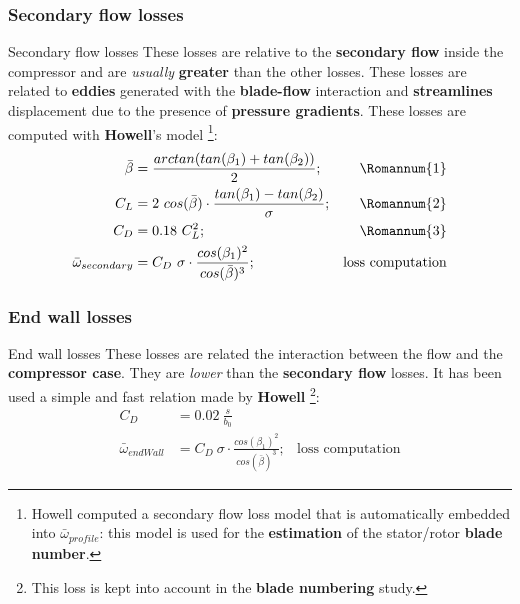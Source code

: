 \subsubsection{Secondary flow losses}
	\begin{frame}{Secondary flow losses}
		These losses are relative to the \textbf{secondary flow} inside the compressor and are \textit{usually} \textbf{greater} than the other losses. These losses are related to \textbf{eddies} generated with the \textbf{blade-flow} interaction and \textbf{streamlines} displacement due to the presence of \textbf{pressure gradients}. 
		\newline 
		These losses are computed with \textbf{Howell}'s model \cite[Ch. 6]{axial2004}\footnote{Howell computed a secondary flow loss model that is automatically embedded into $\bar{\omega}_{profile}$: this model is used for the \textbf{estimation} of the stator/rotor \textbf{blade number}.}:
		\begin{align}
			\bar{\beta} & = \frac{arctan( tan( \beta_1 ) + tan( \beta_2 ) )}{2}; & \text{\Romannum{1}} \nonumber \\ 
			C_{L} & = 2 \ cos( \bar{\beta} ) \cdot \frac{tan( \beta_1 ) - tan( \beta_2 )}{\sigma}; & \text{\Romannum{2}} \nonumber \\
			C_{D} & = 0.18 \ C_{L}^2; & \text{\Romannum{3}} \nonumber \\
			\bar{\omega}_{secondary} & = C_{D} \ \sigma \cdot \frac{cos( \beta_1 )^2}{cos( \bar{\beta} )^3}; & \text{loss computation} \nonumber 
		\end{align}
	\end{frame}

\subsubsection{End wall losses}
	\begin{frame}{End wall losses}
		These losses are related the interaction between the flow and the \textbf{compressor case}. They are \textit{lower} than the \textbf{secondary flow} losses.
		\newline
		It has been used a simple and fast relation made by \textbf{Howell} \cite[Ch. 6]{axial2004}\footnote{This loss is kept into account in the \textbf{blade numbering} study.}:
		\begin{align}
			C_{D} & = 0.02 \ \frac{s}{b_{0}} \nonumber \\ 
			\bar{\omega}_{endWall} & = C_{D} \ \sigma \cdot \frac{cos( \beta_1 )^2}{cos( \bar{\beta} )^3}; & \text{loss computation} \nonumber 
		\end{align}		
	\end{frame}


